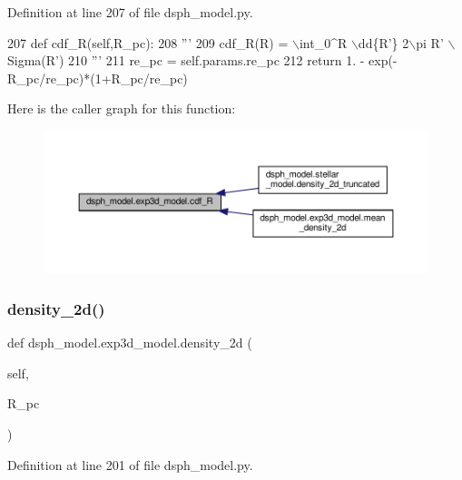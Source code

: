 Definition at line 207 of file dsph\+\_\+model.\+py.


\begin{DoxyCode}
207     \textcolor{keyword}{def }cdf\_R(self,R\_pc):
208         \textcolor{stringliteral}{'''}
209 \textcolor{stringliteral}{        cdf\_R(R) = \(\backslash\)int\_0^R \(\backslash\)dd\{R'\} 2\(\backslash\)pi R' \(\backslash\)Sigma(R')}
210 \textcolor{stringliteral}{        '''}
211         re\_pc = self.params.re\_pc
212         \textcolor{keywordflow}{return} 1. - exp(-R\_pc/re\_pc)*(1+R\_pc/re\_pc)
\end{DoxyCode}
Here is the caller graph for this function\+:\nopagebreak
\begin{figure}[H]
\begin{center}
\leavevmode
\includegraphics[width=350pt]{dc/d37/classdsph__model_1_1exp3d__model_a5720f3c3c46a00563c388a4f70daba0e_icgraph}
\end{center}
\end{figure}
\mbox{\label{classdsph__model_1_1exp3d__model_ab510e347adc62697068885282a6f477a}} 
\subsubsection{\texorpdfstring{density\+\_\+2d()}{density\_2d()}}
{\footnotesize\ttfamily def dsph\+\_\+model.\+exp3d\+\_\+model.\+density\+\_\+2d (\begin{DoxyParamCaption}\item[{}]{self,  }\item[{}]{R\+\_\+pc }\end{DoxyParamCaption})}



Definition at line 201 of file dsph\+\_\+model.\+py.


